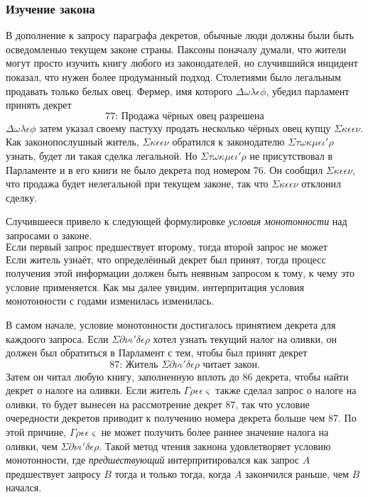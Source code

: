 \documentclass[12pt, a4paper]{article} %
\begin{document}
\subsubsection{Изучение закона}

В дополнение к запросу параграфа декретов, обычные люди должны были быть осведомленыо текущем законе страны. Паксоны поначалу думали, что жители могут просто изучить книгу любого из законодателей, но случившийся инцидент показал, что нужен более продуманный подход. Столетиями было легальным продавать только белых овец. Фермер, имя которого $\Delta\omega\lambda\epsilon\phi$, убедил парламент принять декрет
\[
    \mbox{77: Продажа чёрных овец разрешена}
\]
$\Delta\omega\lambda\epsilon\phi$ затем указал своему пастуху продать несколько чёрных овец купцу $\Sigma\kappa\epsilon\epsilon\nu$. Как законопослушный житель, $\Sigma\kappa\epsilon\epsilon\nu$ обратился к законодателю $\Sigma\tau\omega\kappa\mu\epsilon\iota'\rho$ узнать, будет ли такая сделка легальной. Но $\Sigma\tau\omega\kappa\mu\epsilon\iota'\rho$ не присутствовал в Парламенте и в его книги не было декрета под номером 76. Он сообщил $\Sigma\kappa\epsilon\epsilon\nu$, что продажа будет нелегальной при текущем законе, так что  $\Sigma\kappa\epsilon\epsilon\nu$ отклонил сделку.

Случившееся привело к следующей формулировке \textit{условия монотонности} над запросами о законе.
\[
    \mbox{Если первый запрос предшествует второму, тогда второй запрос не может показать более раннее состояние закона, чем первый.}
\]
Если житель узнаёт, что определённый декрет был принят, тогда процесс получения этой информации должен быть неявным запросом к тому, к чему это условие применяется. Как мы далее увидим, интерпритация условия монотонности с годами изменилась изменилась.

В самом начале, условие монотонности достигалось принятием декрета для каждоого запроса. Если $\Sigma\partial\nu\iota'\delta\epsilon\rho$ хотел узнать текущий налог на оливки, он должен был обратиться в Парламент с тем, чтобы был принят декрет 
\[
    \mbox{87: Житель $\Sigma\partial\nu\iota'\delta\epsilon\rho$ читает закон.}
\]
Затем он читал любую книгу, заполненную вплоть до 86 декрета, чтобы найти декрет о налоге на оливки. Если житель $\Gamma\rho\epsilon\epsilon\varsigma$ также сделал запрос о налоге на оливки, то будет вынесен на рассмотрение декрет 87, так что условие очередности декретов приводит к получению номера декрета больше чем 87. По этой причине, $\Gamma\rho\epsilon\epsilon\varsigma$ не может получить более раннее значение налога на оливки, чем $\Sigma\partial\nu\iota'\delta\epsilon\rho$. Такой метод чтения закнона удовлетворяет условию монотонности, где \textit{предшествующий} интерпритировался как запрос $A$ предшествует запросу $B$ тогда и только тогда, когда $A$ закончился раньше, чем $B$ начался.
\end{document}
